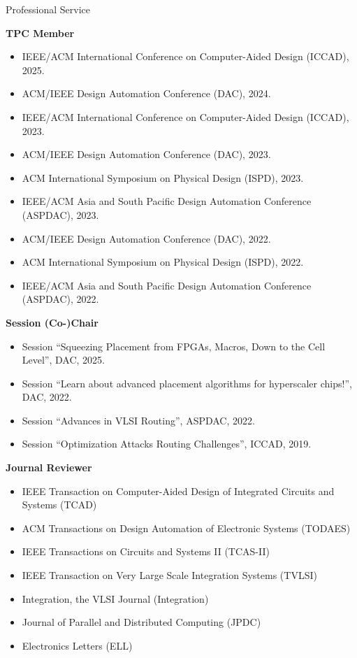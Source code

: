
\begin{rSection}{Professional Service}

\textbf{TPC Member}
\begin{itemize}
    \item IEEE/ACM International Conference on Computer-Aided Design (ICCAD), 2025.
    \item ACM/IEEE Design Automation Conference (DAC), 2024.
    \item IEEE/ACM International Conference on Computer-Aided Design (ICCAD), 2023.
    \item ACM/IEEE Design Automation Conference (DAC), 2023.
    \item ACM International Symposium on Physical Design (ISPD), 2023.
    \item IEEE/ACM Asia and South Pacific Design Automation Conference (ASPDAC), 2023.
    \item ACM/IEEE Design Automation Conference (DAC), 2022.
    \item ACM International Symposium on Physical Design (ISPD), 2022.
    \item IEEE/ACM Asia and South Pacific Design Automation Conference (ASPDAC), 2022.
\end{itemize}

\textbf{Session (Co-)Chair}
\begin{itemize}
    \item Session ``Squeezing Placement from FPGAs, Macros, Down to the Cell Level'', DAC, 2025.
    \item Session ``Learn about advanced placement algorithms for hyperscaler chips!'', DAC, 2022.
    \item Session ``Advances in VLSI Routing'', ASPDAC, 2022.
    \item Session ``Optimization Attacks Routing Challenges'', ICCAD, 2019.
\end{itemize}

\textbf{Journal Reviewer}
\begin{itemize}
    \item IEEE Transaction on Computer-Aided Design of Integrated Circuits and Systems (TCAD)
    \item ACM Transactions on Design Automation of Electronic Systems (TODAES)
    \item IEEE Transactions on Circuits and Systems II (TCAS-II)
    \item IEEE Transaction on Very Large Scale Integration Systems (TVLSI)
    \item Integration, the VLSI Journal (Integration)
    \item Journal of Parallel and Distributed Computing (JPDC)
    \item Electronics Letters (ELL)
\end{itemize}


\end{rSection}
